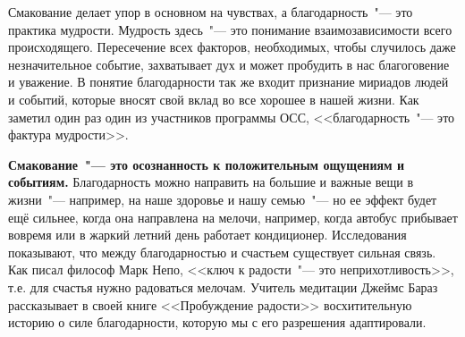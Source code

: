 Смакование делает упор в основном на чувствах, а благодарность~"--- это практика мудрости. Мудрость здесь~"--- это понимание взаимозависимости всего происходящего. Пересечение всех факторов, необходимых, чтобы случилось даже незначительное событие, захватывает дух и может пробудить в нас благоговение и уважение. В понятие благодарности так же входит признание мириадов людей и событий, которые вносят свой вклад во все хорошее в нашей жизни. Как заметил один раз один из участников программы ОСС, <<благодарность~"--- это фактура мудрости>>.

\textbf{Смакование~"--- это осознанность к положительным ощущениям и событиям.} Благодарность можно направить на большие и важные вещи в жизни~"--- например, на наше здоровье и нашу семью~"--- но ее эффект будет ещё сильнее, когда она направлена на мелочи, например, когда автобус прибывает вовремя или в жаркий летний день работает кондиционер. Исследования показывают, что между благодарностью и счастьем существует сильная связь. Как писал философ Марк Непо, <<ключ к радости~"--- это неприхотливость>>, т.е. для счастья нужно радоваться мелочам. Учитель медитации Джеймс Бараз рассказывает в своей книге <<Пробуждение радости>> восхитительную историю о силе благодарности, которую мы с его разрешения адаптировали.

